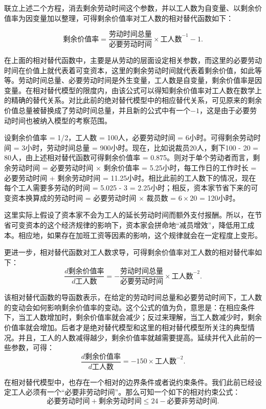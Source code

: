 \documentclass[a4paper,11pt]{ctexart}
\begin{document}
联立上述二个方程，消去剩余劳动时间这个参数，并以工人数为自变量、以剩余价值率为因变量加以整理，可得剩余价值率对工人数的相对替代函数如下：

$$\mbox{剩余价值率} = \frac{\mbox{劳动时间总量}}{\mbox{必要劳动时间}} \times \mbox{工人数}^{-1} - 1.$$

在上面的相对替代函数中，主要是从劳动的层面设定相关参数，而这里的必要劳动时间在价值上就代表着可变资本，这里的剩余劳动时间就代表着剩余价值，如此等等。劳动时间总量、必要劳动时间是外生变量，工人数是自变量，剩余价值率是因变量。在相对替代模型的限度内，由该公式可以得知剩余价值率对工人数在数学上的精确的替代关系。对比此前的绝对替代模型中的相应替代关系，可见原来的剩余价值总量被替换成了劳动时间总量，并且新的公式中有一个$-1$，这是由于必要劳动时间也被纳入模型的考察范围。

设剩余价值率 = 1/2，工人数 = 100人，必要劳动时间 = 6小时。可得剩余劳动时间 = 3小时，劳动时间总量 = 900小时。现在，比如说裁员20人，剩下100 - 20 = 80人，由上述相对替代函数可得剩余价值率 = 0.875。则对于单个劳动者而言，剩余劳动时间 = 必要劳动时间 $\times$ 剩余价值率 = 5.25小时，每工作日的工作时长 = 必要劳动时间 + 剩余劳动时间 = 11.25小时。相比此前的工人数下的情况，现在每个工人需要多劳动的时间 = 5.025 - 3 = 2.25小时；相反，资本家节省下来的可变资本换算成的劳动时间 = 必要劳动时间 $\times$ 裁员数 = $6 \times 20$ = 120小时。

这里实际上假设了资本家不会为工人的延长劳动时间而额外支付报酬。所以，在节省可变资本的这个经济规律的影响下，资本家会拼命地“减员增效”，降低用工成本。相应地，如果存在加班工资等因素的影响，这个规律就会在一定程度上变形。

更进一步，相对替代函数对工人数求导，可得剩余价值率对工人数的相对替代率如下：$$\frac{d\mbox{剩余价值率}}{d\mbox{工人数}} = -\frac{\mbox{劳动时间总量}}{\mbox{必要劳动时间}} \times \mbox{工人数}^{-2}.$$

该相对替代函数的导函数表示，在给定的劳动时间总量和必要劳动时间下，工人数的变动会如何影响剩余价值率的变动。这个公式的值为负，意思是：在相应条件下，当工人数增加时，剩余价值率就会减少；反过来理解，当工人数减少时，剩余价值率就会增加。后者才是绝对替代模型和这里的相对替代模型所关注的典型情况。并且，工人的人数减得越少，剩余价值率就越需要提高。延续并代入此前的一些参数，可得：$$\frac{d\mbox{剩余价值率}}{d\mbox{工人数}} = -150 \times \mbox{工人数}^{-2}.$$

在相对替代模型中，也存在一个相对的边界条件或者说约束条件。我们此前已经设定工人必须有一个“必要非劳动时间”。那么可知一个如下的相对约束公式：$$\mbox{必要劳动时间} + \mbox{剩余劳动时间} \le 24 - \mbox{必要非劳动时间}.$$
\end{document}
